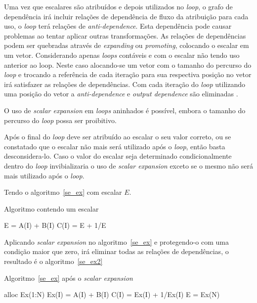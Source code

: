 Uma vez que escalares são atribuídos e depois utilizados no \textit{loop}, o 
grafo de dependência irá incluir relações de dependência de fluxo da atribuição 
para cada uso, o \textit{loop} terá relações de \textit{anti-dependence}.
Esta dependência pode causar problemas ao tentar aplicar outras transformações.
As relações de dependências podem ser quebradas através de \textit{expanding} ou 
\textit{promoting}, colocando o escalar em um vetor.
Considerando apenas \textit{loops} contáveis e com o escalar não tendo uso
anterior ao loop. Neste caso alocando-se um vetor com o tamanho do percurso do
\textit{loop} e trocando a referência de cada iteração para sua respectiva
posição no vetor irá satisfazer as relações de dependências. Com cada iteração
do \textit{loop} utilizando uma posição do vetor a \textit{anti-dependence} e 
\textit{output dependence} são eliminadas \cite{Wolf:1996}.

O uso de \textit{scalar expansion} em \textit{loops} aninhados é possível,
embora o tamanho do percurso do \textit{loop} possa ser proibitivo.

Após o final do \textit{loop} deve ser atribuído ao escalar o seu valor correto,
ou se constatado que o escalar não mais será utilizado após o \textit{loop},
então basta desconsidera-lo.
Caso o valor do escalar seja determinado condicionalmente dentro do
\textit{loop} invibializaria o uso de \textit{scalar expansion} exceto se o
mesmo não será mais utilizado após o \textit{loop}.

Tendo o algoritmo~\ref{se_ex} com escalar $E$.


\begin{algorithm}
\caption{Algoritmo contendo um escalar}
\label{se_ex}
\begin{algorithmic}[1]

\STATE E = A(I) + B(I)
\STATE C(I) = E + 1/E
\ENDFOR

\end{algorithmic}
\end{algorithm}

Aplicando \textit{scalar expansion} no algoritmo~\ref{se_ex} e protegendo-o com
uma condição maior que zero, irá eliminar todas as relações de dependências, o
resultado é o algoritmo~\ref{se_ex2}

\begin{algorithm}
\caption{Algoritmo~\ref{se_ex} após o \textit{scalar expansion}}
\label{se_ex2}
\begin{algorithmic}[1]

\STATE alloc Ex(1:N)
\STATE Ex(I) = A(I) + B(I)
\STATE C(I) = Ex(I) + 1/Ex(I)
\ENDFOR
\STATE E = Ex(N)
\ENDIF

\end{algorithmic}
\end{algorithm}




